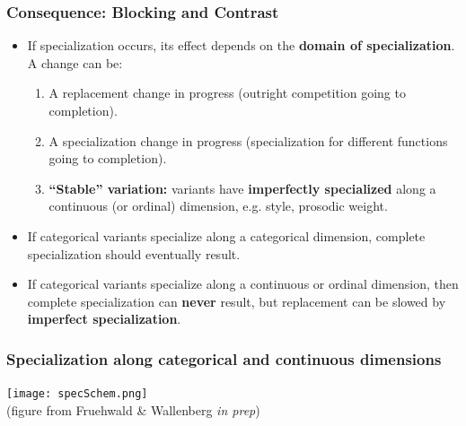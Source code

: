 \documentclass[hyperref={pdfpagelabels=false}]{beamer}
\begin{document}



\begin{frame}
\frametitle{Consequence: Blocking and Contrast}
\begin{itemize}
	\item If specialization occurs, its effect depends on the \textbf{domain of specialization}. A change can be:
		\begin{enumerate}
			\item A replacement change in progress (outright competition going to completion).
			\item A specialization change in progress (specialization for different functions going to completion).
			\item \textbf{``Stable'' variation:} variants have \textbf{imperfectly specialized} along a continuous (or ordinal) dimension, e.g. style, prosodic weight. 
		\end{enumerate}
	\item If categorical variants specialize along a categorical dimension, complete specialization should eventually result.
	\item If categorical variants specialize along a continuous or ordinal dimension, then complete specialization can \textbf{never} result, but replacement can be slowed by \textbf{imperfect specialization}.
\end{itemize}

\end{frame}


\begin{frame}
\frametitle{Specialization along categorical and continuous dimensions}

\begin{center}
\texttt{[image: specSchem.png]}\\
(figure from Fruehwald \& Wallenberg \textsl{in prep})\nocite{fruehwaldwallenberginprep}
\end{center}

\end{frame}
\end{document}
